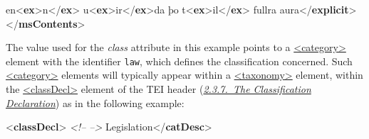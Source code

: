 \begin{shaded}
\hspace*{1em}en{<\textbf{ex}>}n{</\textbf{ex}>} u{<\textbf{ex}>}ir{</\textbf{ex}>}da þo t{<\textbf{ex}>}il{</\textbf{ex}>} fullra aura{</\textbf{explicit}>}\mbox{}\newline 
{}\mbox{}\newline 
{</\textbf{msContents}>}\end{shaded}\egroup\par \noindent  The value used for the {\itshape class} attribute in this example points to a \hyperref[TEI.category]{<category>} element with the identifier \texttt{law}, which defines the classification concerned. Such \hyperref[TEI.category]{<category>} elements will typically appear within a \hyperref[TEI.taxonomy]{<taxonomy>} element, within the \hyperref[TEI.classDecl]{<classDecl>} element of the TEI header (\textit{\hyperref[HD55]{2.3.7.\ The Classification Declaration}}) as in the following example: \par\bgroup{}\exampleFont \begin{shaded}\noindent\mbox{}{<\textbf{classDecl}>}\mbox{}\newline 
{}\mbox{}\newline 
\textit{<!-- -->}\mbox{}\newline 
\hspace*{1em}\mbox{}\newline 
\hspace*{1em}\hspace*{1em}Legislation{</\textbf{catDesc}>}\mbox{}\newline 
\hspace*{1em}\mbox{}\newline 
\hspace*{1em}\mbox{}\newline 

\end{shaded}
